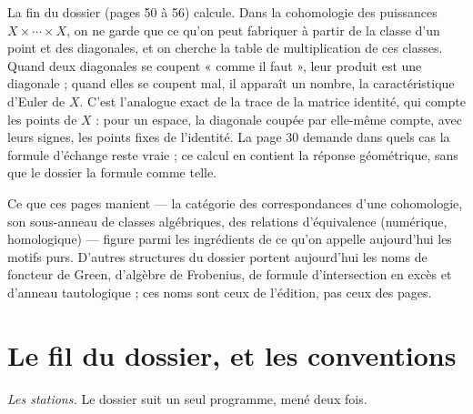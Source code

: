 \documentclass[11pt,a4paper]{article}
\begin{document}
\begin{resume}
La fin du dossier (pages 50 à 56) calcule. Dans la cohomologie des puissances
$X \times \cdots \times X$, on ne garde que ce qu'on peut fabriquer à partir de
la classe d'un point et des diagonales, et on cherche la table de
multiplication de ces classes. Quand deux diagonales se coupent « comme il
faut », leur produit est une diagonale ; quand elles se coupent mal, il
apparaît un nombre, la caractéristique d'Euler de $X$. C'est l'analogue exact de
la trace de la matrice identité, qui compte les points de $X$ : pour un espace,
la diagonale coupée par elle-même compte, avec leurs signes, les points fixes
de l'identité. La page 30 demande dans quels cas la formule d'échange reste
vraie ; ce calcul en contient la réponse géométrique, sans que le dossier la
formule comme telle.

Ce que ces pages manient --- la catégorie des correspondances d'une
cohomologie, son sous-anneau de classes algébriques, des relations
d'équivalence (numérique, homologique) --- figure parmi les ingrédients de ce
qu'on appelle aujourd'hui les motifs purs. D'autres structures du dossier
portent aujourd'hui les noms de foncteur de Green, d'algèbre de Frobenius, de
formule d'intersection en excès et d'anneau tautologique ; ces noms sont
ceux de l'édition, pas ceux des pages.

\end{resume}

\section*{Le fil du dossier, et les conventions}

\emph{Les stations.} Le dossier suit un seul programme, mené deux fois.
\end{document}
